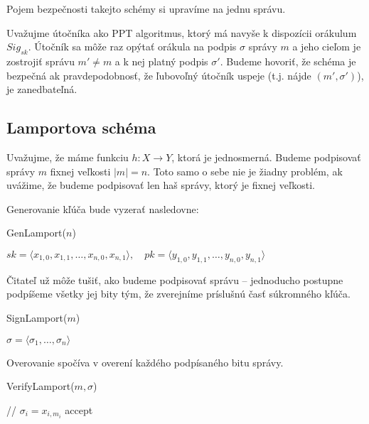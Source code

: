 Pojem bezpečnosti takejto schémy si upravíme na jednu správu.
\begin{definicia}[Bezpečnosť]
    Uvažujme útočníka ako PPT algoritmus, ktorý má navyše k dispozícii
    orákulum $Sig_{sk}$. Útočník sa môže raz opýtať orákula na podpis
    $\sigma$ správy $m$ a jeho cieľom je zostrojiť
    správu $m' \ne m$ a k nej platný podpis $\sigma'$.
    Budeme hovoriť, že schéma je bezpečná ak pravdepodobnosť,
    že ľubovoľný útočník uspeje (t.j. nájde $(m',\sigma')$), je zanedbateľná.
\end{definicia}

\subsection{Lamportova schéma}

Uvažujme, že máme funkciu $h: X \rightarrow Y$, ktorá je jednosmerná.
Budeme podpisovať správy $m$ fixnej veľkosti $|m|=n$. Toto samo o sebe nie
je žiadny problém, ak uvážime, že budeme podpisovať len haš správy, ktorý je
fixnej veľkosti.

Generovanie kľúča bude vyzerať nasledovne:

\begin{procedure}[H]
    \caption{GenLamport($n$)}
    \Return $sk=\langle x_{1,0},x_{1,1},\ldots,x_{n,0},x_{n,1}\rangle,\quad
             pk=\langle y_{1,0},y_{1,1},\ldots,y_{n,0},y_{n,1} \rangle$\;
\end{procedure}

Čitateľ už môže tušiť, ako budeme podpisovať správu -- jednoducho postupne
podpíšeme všetky jej bity tým, že zverejníme príslušnú časť súkromného
kľúča.

\begin{procedure}[H]
    \caption{SignLamport($m$)}
    \Return $\sigma = \langle \sigma_1, \ldots, \sigma_n \rangle$
\end{procedure}

Overovanie spočíva v overení každého podpísaného bitu správy.

\begin{procedure}[H]
    \caption{VerifyLamport($m, \sigma$)}
    // $\sigma_i = x_{i, m_i}$ \;
    \Return accept\;
\end{procedure}

